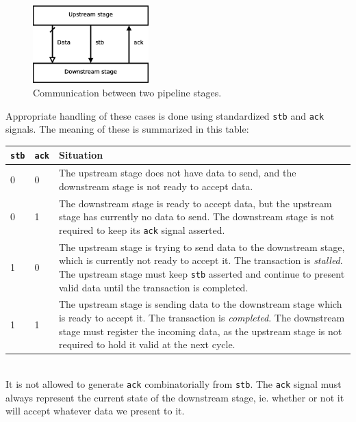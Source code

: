 \documentclass[a4paper,11pt]{article}
\begin{document}
\begin{figure}[H]
\centering
\includegraphics[height=30mm]{comm.eps}
\caption{Communication between two pipeline stages.}\label{fig:comm}
\end{figure}

Appropriate handling of these cases is done using standardized \verb!stb! and \verb!ack! signals. The meaning of these is summarized in this table:\\

\begin{tabular}{|l|l|p{12cm}|}
\hline
\verb!stb! & \bf \verb!ack! & \bf Situation \\
\hline
0 & 0 & The upstream stage does not have data to send, and the downstream stage is not ready to accept data. \\
\hline
0 & 1 & The downstream stage is ready to accept data, but the upstream stage has currently no data to send. The downstream stage is not required to keep its \verb!ack! signal asserted. \\
\hline
1 & 0 & The upstream stage is trying to send data to the downstream stage, which is currently not ready to accept it. The transaction is \textit{stalled}. The upstream stage must keep \verb!stb! asserted and continue to present valid data until the transaction is completed. \\
\hline
1 & 1 & The upstream stage is sending data to the downstream stage which is ready to accept it. The transaction is \textit{completed}. The downstream stage must register the incoming data, as the upstream stage is not required to hold it valid at the next cycle. \\
\hline
\end{tabular}\\

It is not allowed to generate \verb!ack! combinatorially from \verb!stb!. The \verb!ack! signal must always represent the current state of the downstream stage, ie. whether or not it will accept whatever data we present to it.
\end{document}
